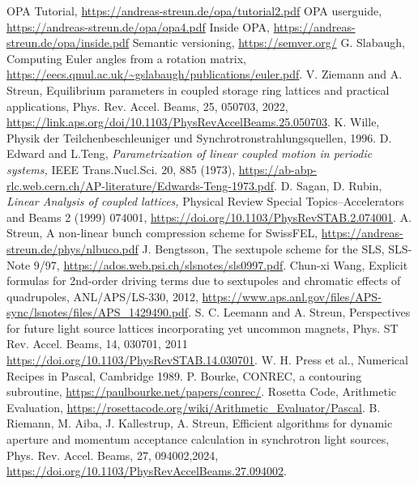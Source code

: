 \documentclass[12pt]{article}
\begin{document}
\begin{thebibliography}{18}
OPA Tutorial, \url{https://andreas-streun.de/opa/tutorial2.pdf}
OPA userguide, \url{https://andreas-streun.de/opa/opa4.pdf} 
Inside OPA, \url{https://andreas-streun.de/opa/inside.pdf} 
Semantic versioning, \url{https://semver.org/}
G. Slabaugh, Computing Euler angles from a rotation matrix, \url{https://eecs.qmul.ac.uk/~gslabaugh/publications/euler.pdf}.
V. Ziemann and A. Streun, Equilibrium parameters in coupled storage ring lattices and practical applications, Phys. Rev. Accel. Beams, 25, 050703, 2022, \url{https://link.aps.org/doi/10.1103/PhysRevAccelBeams.25.050703}.
K. Wille, Physik der Teilchenbeschleuniger und Synchrotronstrahlungsquellen, 1996.
 D. Edward and L.Teng, {\em Parametrization of linear coupled motion in periodic
systems,} IEEE Trans.Nucl.Sci. 20, 885 (1973), \url{https://ab-abp-rlc.web.cern.ch/AP-literature/Edwards-Teng-1973.pdf}.
D. Sagan, D. Rubin, {\em Linear Analysis of coupled lattices,} Physical Review Special
Topics--Accelerators and Beams 2 (1999) 074001, \url{https://doi.org/10.1103/PhysRevSTAB.2.074001}.
A. Streun, A non-linear bunch compression scheme for SwissFEL, \url{https://andreas-streun.de/phys/nlbuco.pdf}
J. Bengtsson, The sextupole scheme for the SLS, SLS-Note 9/97,  \url{https://ados.web.psi.ch/slsnotes/sls0997.pdf}.
Chun-xi Wang, Explicit formulas for 2nd-order driving terms due to sextupoles and chromatic effects of quadrupoles, ANL/APS/LS-330, 2012, \url{https://www.aps.anl.gov/files/APS-sync/lsnotes/files/APS_1429490.pdf}.
S. C. Leemann and A. Streun, Perspectives for future light source lattices incorporating yet uncommon magnets, Phys. ST Rev. Accel. Beams, 14, 030701, 2011 \url{https://doi.org/10.1103/PhysRevSTAB.14.030701}.
W. H. Press et al., Numerical Recipes in Pascal, Cambridge 1989.
P. Bourke, CONREC, a contouring subroutine, \url{https://paulbourke.net/papers/conrec/}.
Rosetta Code, Arithmetic Evaluation, \url{https://rosettacode.org/wiki/Arithmetic\_Evaluator/Pascal}.
B. Riemann, M. Aiba, J. Kallestrup, A. Streun, Efficient algorithms for dynamic aperture and momentum acceptance calculation in synchrotron light sources, Phys. Rev. Accel. Beams, 27, 094002,2024, \url{https://doi.org/10.1103/PhysRevAccelBeams.27.094002}.
\end{thebibliography}
\end{document}
